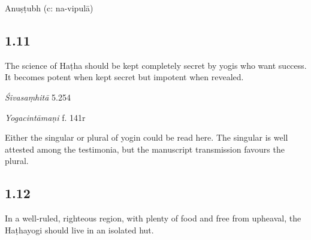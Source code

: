 \begin{ekdosis}
\begin{metre}[hp01_010]
Anuṣṭubh (c: na-vipulā)
\end{metre}

\subsection*{1.11}
\begin{translation}[hp01_011]
The science of Haṭha should be kept completely secret by yogis who want success. It becomes potent when kept secret but impotent when revealed.
\end{translation}

\begin{sources}[hp01_011]
\emph{Śivasaṃhitā} 5.254

\begin{versinnote}
\tl{\var{haṭhavidyā ... icchatā ] \emph{om.} III–XII, XIV}\\!}
\end{versinnote}

\end{sources}

\begin{testimonia}[hp01_011]
\emph{Yogacintāmaṇi} f. 141r %

\begin{versinnote}
\end{versinnote}

\end{testimonia}

\begin{philcomm}[hp01_011]        
Either the singular or plural of yogin could be read here. The singular is well attested among the testimonia, but the manuscript transmission favours the plural.  
\end{philcomm}

\subsection*{1.12}
\begin{translation}[hp01_012]
In a well-ruled, righteous region, with plenty of food and free from upheaval, the Haṭhayogi should live in an isolated hut.%
\end{translation}


\end{ekdosis}
